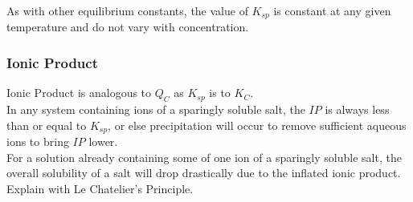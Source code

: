 \documentclass[../main]{subfiles}
\begin{document}
	As with other equilibrium constants, the value of \(K_{sp}\) is constant at any given temperature and do not vary with concentration.

	\subsubsection{Ionic Product}


	Ionic Product is analogous to \(Q_C\) as \(K_{sp}\) is to \(K_C\). \\

	In any system containing ions of a sparingly soluble salt, the \(IP\) is always less than or equal to \(K_{sp}\), or else precipitation will occur to remove sufficient aqueous ions to bring \(IP\) lower. \\

	For a solution already containing some of one ion of a sparingly soluble salt, the overall solubility of a salt will drop drastically due to the inflated ionic product. Explain with Le Chatelier's Principle. \\

	\subsubsection{}
\end{document}
